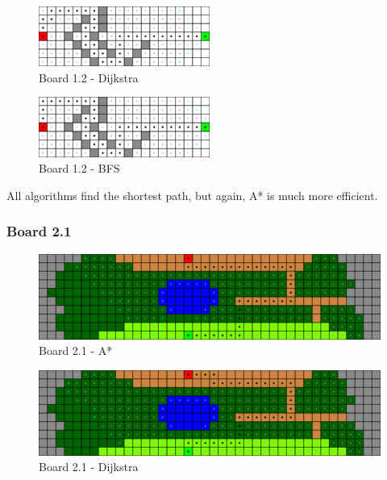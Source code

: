 \begin{figure}[h!]
  \centering
    \includegraphics[width=0.5\textwidth]{img/board-1-2-dijkstra}
    \caption{Board 1.2 - Dijkstra}
\end{figure}

\begin{figure}[h!]
  \centering
    \includegraphics[width=0.5\textwidth]{img/board-1-2-bfs}
    \caption{Board 1.2 - BFS}
\end{figure}

All algorithms find the shortest path, but again, A* is much more efficient.

\newpage

\subsubsection*{Board 2.1}

\begin{figure}[h!]
  \centering
    \includegraphics[width=\textwidth]{img/board-2-1-astar}
    \caption{Board 2.1 - A*}
\end{figure}

\begin{figure}[h!]
  \centering
    \includegraphics[width=\textwidth]{img/board-2-1-dijkstra}
    \caption{Board 2.1 - Dijkstra}
\end{figure}

